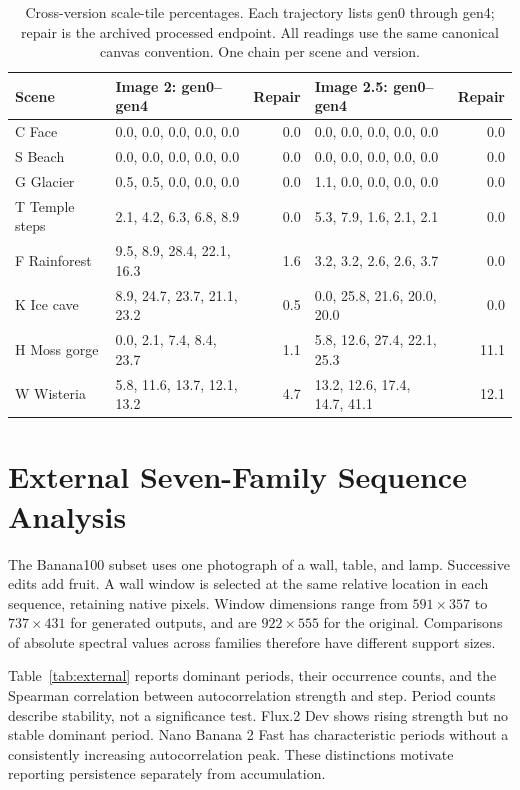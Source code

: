 \documentclass[sigplan,10pt,nonacm]{acmart}
\begin{document}
\begin{table}[t]
\caption{Cross-version scale-tile percentages. Each trajectory lists gen0 through gen4; repair is the archived processed endpoint. All readings use the same canonical canvas convention. One chain per scene and version.}
\label{tab:crossversion}
\centering\small
\begin{tabular}{llrlr}
\toprule
Scene & Image 2: gen0--gen4 & Repair & Image 2.5: gen0--gen4 & Repair \\
\midrule
C Face & 0.0, 0.0, 0.0, 0.0, 0.0 & 0.0 & 0.0, 0.0, 0.0, 0.0, 0.0 & 0.0 \\
S Beach & 0.0, 0.0, 0.0, 0.0, 0.0 & 0.0 & 0.0, 0.0, 0.0, 0.0, 0.0 & 0.0 \\
G Glacier & 0.5, 0.5, 0.0, 0.0, 0.0 & 0.0 & 1.1, 0.0, 0.0, 0.0, 0.0 & 0.0 \\
T Temple steps & 2.1, 4.2, 6.3, 6.8, 8.9 & 0.0 & 5.3, 7.9, 1.6, 2.1, 2.1 & 0.0 \\
F Rainforest & 9.5, 8.9, 28.4, 22.1, 16.3 & 1.6 & 3.2, 3.2, 2.6, 2.6, 3.7 & 0.0 \\
K Ice cave & 8.9, 24.7, 23.7, 21.1, 23.2 & 0.5 & 0.0, 25.8, 21.6, 20.0, 20.0 & 0.0 \\
H Moss gorge & 0.0, 2.1, 7.4, 8.4, 23.7 & 1.1 & 5.8, 12.6, 27.4, 22.1, 25.3 & 11.1 \\
W Wisteria & 5.8, 11.6, 13.7, 12.1, 13.2 & 4.7 & 13.2, 12.6, 17.4, 14.7, 41.1 & 12.1 \\
\bottomrule
\end{tabular}
\end{table}

\section{External Seven-Family Sequence Analysis}
\label{app:external}
The Banana100 subset uses one photograph of a wall, table, and lamp. Successive edits add fruit. A wall window is selected at the same relative location in each sequence, retaining native pixels. Window dimensions range from $591\times357$ to $737\times431$ for generated outputs, and are $922\times555$ for the original. Comparisons of absolute spectral values across families therefore have different support sizes.

Table~\ref{tab:external} reports dominant periods, their occurrence counts, and the Spearman correlation between autocorrelation strength and step. Period counts describe stability, not a significance test. Flux.2 Dev shows rising strength but no stable dominant period. Nano Banana 2 Fast has characteristic periods without a consistently increasing autocorrelation peak. These distinctions motivate reporting persistence separately from accumulation.
\end{document}
